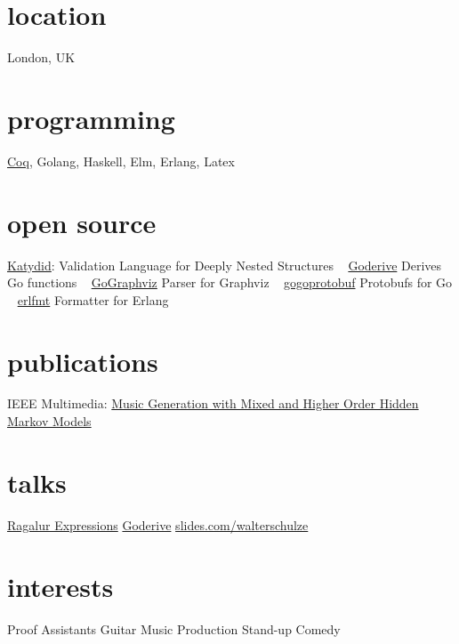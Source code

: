 \documentclass[print]{friggeri-cv-a4} %
\begin{document}

\begin{aside} %
\section{location}
London, UK
\section{programming}
\href{https://coq.inria.fr/}{Coq}, Golang, Haskell, Elm, Erlang, Latex
\section{open source}
\href{https://github.com/katydid/katydid}{Katydid}:
Validation Language for Deeply Nested Structures
~
\href{https://github.com/awalterschulze/goderive}{Goderive} 
Derives Go functions
~
\href{https://github.com/awalterschulze/gographviz}{GoGraphviz} 
Parser for Graphviz
~
\href{https://github.com/gogo/protobuf}{gogoprotobuf} 
Protobufs for Go 
~
\href{https://github.com/WhatsApp/erlfmt}{erlfmt}  
Formatter for Erlang
\section{publications}
IEEE Multimedia: \href{http://doi.ieeecomputersociety.org/10.1109/MMUL.2010.44}{Music Generation with Mixed and Higher Order Hidden Markov Models}
\section{talks}
\href{https://www.youtube.com/playlist?list=PLYwF9EIrl42S9ldgii7kfBEIHPle7PqMk}{\faYoutubePlay Ragalur Expressions} 
\href{https://www.youtube.com/watch?v=qFYByoGFIUE}{\faYoutubePlay Goderive}
\href{https://slides.com/walterschulze}{slides.com/walterschulze}
\section{interests}
Proof Assistants
Guitar
Music Production
Stand-up Comedy
\end{aside}
\end{document}
